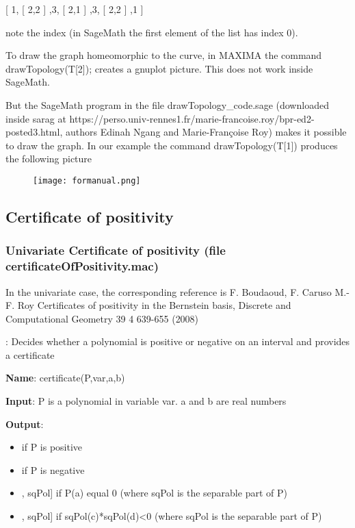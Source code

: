 \documentclass{article}
\begin{document}
   [ 1, [ 2,2 ] ,3, [ 2,1 ] ,3, [ 2,2 ] ,1 ] 
   
   \noindent note the index (in SageMath the first element of the list has index 0).
   
To draw the graph homeomorphic to the curve, in MAXIMA  the command  drawTopology(T[2]);
creates a gnuplot picture. This does not work inside SageMath.

\noindent But the SageMath program in the file drawTopology\_code.sage (downloaded inside sarag
 at https://perso.univ-rennes1.fr/marie-francoise.roy/bpr-ed2-posted3.html, authors Edinah Ngang and Marie-Fran\c coise Roy)  makes it possible to draw the graph. In our example the command  drawTopology(T[1]) produces the following picture
{\center
\begin{figure}[h!]
  \texttt{[image: formanual.png]}
\end{figure}
}

\newpage 
 
\subsection{Certificate of positivity}

\subsubsection{Univariate Certificate of positivity (file certificateOfPositivity.mac)}

 In the univariate case, the corresponding reference is F. Boudaoud, F.
Caruso M.-F. Roy Certificates of positivity in the Bernstein basis, Discrete
and Computational Geometry 39 4 639-655 (2008)


:
  Decides whether a polynomial is positive or negative on an interval and
  provides a certificate
  
 {\bf Name}: certificate(P,var,a,b)
  
{\bf Input}: P is a polynomial in variable var. a and b are real numbers
  
{\bf Output}:
  \begin{itemize}
    \item [1, certificate] if P is positive
    \item [-1, certificate] if P is negative
    \item [0, [a], sqPol] if P(a) equal 0 (where sqPol is the separable
    part of P)
    \item [0, [c,d], sqPol] if sqPol(c)*sqPol(d)<0 (where sqPol is the
    separable part of P)
  \end{itemize}
  
\end{document}
